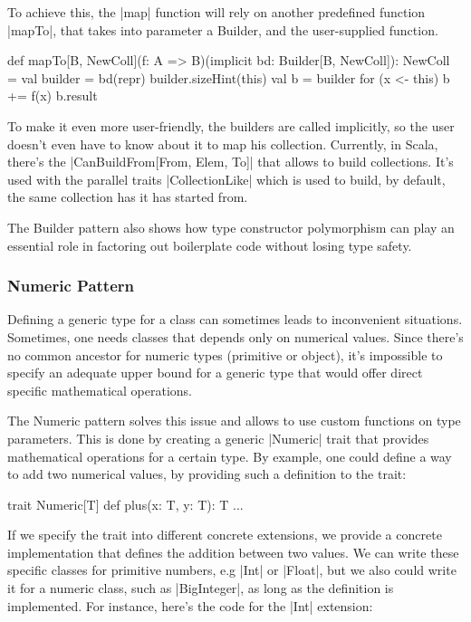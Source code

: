 To achieve this, the |map| function will rely on another predefined function |mapTo|, that takes into parameter a Builder, and the user-supplied function.

\begin{lstlisting-nobreak}
 def mapTo[B, NewColl](f: A => B)(implicit bd: Builder[B, NewColl]): NewColl = {
   val builder = bd(repr)
   builder.sizeHint(this)
   val b = builder
   for (x <- this) b += f(x)
   b.result
 }
\end{lstlisting-nobreak}

To make it even more user-friendly, the builders are called implicitly, so the user doesn't even have to know about it to map his collection. Currently, in Scala, there's the |CanBuildFrom[From, Elem, To]| that allows to build collections. It's used with the parallel traits |CollectionLike| which is used to build, by default, the same collection has it has started from.

The Builder pattern also shows how type constructor polymorphism can play an essential role in factoring out boilerplate code without losing type safety.\cite{adriaan}

\subsubsection{Numeric Pattern}

Defining a generic type for a class can sometimes leads to inconvenient situations. Sometimes, one needs classes that depends only on numerical values. Since there's no common ancestor for numeric types (primitive or object), it's impossible to specify an adequate upper bound for a generic type that would offer direct specific mathematical operations.

The Numeric pattern solves this issue and allows to use custom functions on type parameters. This is done by creating a generic |Numeric| trait that provides mathematical operations for a certain type. By example, one could define a way to add two numerical values, by providing such a definition to the trait:

\begin{lstlisting-nobreak}
 trait Numeric[T] {
   def plus(x: T, y: T): T
   ...
 }
\end{lstlisting-nobreak}

If we specify the trait into different concrete extensions, we provide a concrete implementation that defines the addition between two values. We can write these specific classes for primitive numbers, e.g |Int| or |Float|, but we also could write it for a numeric class, such as |BigInteger|, as long as the definition is implemented. For instance, here's the code for the |Int| extension:

